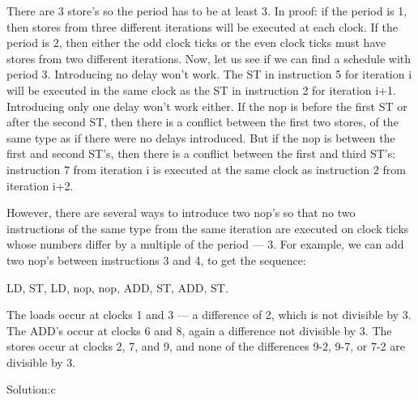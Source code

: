 \begin{problem}
{\color{red}

There are 3 store's so the period has to be at least 3. In proof: if the period is 1, then stores from three different iterations will be executed at each clock. If the period is 2, then either the odd clock ticks or the even clock ticks must have stores from two different iterations.
Now, let us see if we can find a schedule with period 3. Introducing no delay won't work. The ST in instruction 5 for iteration i will be executed in the same clock as the ST in instruction 2 for iteration i+1. Introducing only one delay won't work either. If the nop is before the first ST or after the second ST, then there is a conflict between the first two stores, of the same type as if there were no delays introduced. But if the nop is between the first and second ST's, then there is a conflict between the first and third ST's: instruction 7 from iteration i is executed at the same clock as instruction 2 from iteration i+2.

However, there are several ways to introduce two nop's so that no two instructions of the same type from the same iteration are executed on clock ticks whose numbers differ by a multiple of the period --- 3. For example, we can add two nop's between instructions 3 and 4, to get the sequence:

LD, ST, LD, nop, nop, ADD, ST, ADD, ST.

The loads occur at clocks 1 and 3 --- a difference of 2, which is not divisible by 3. The ADD's occur at clocks 6 and 8, again a difference not divisible by 3. The stores occur at clocks 2, 7, and 9, and none of the differences 9-2, 9-7, or 7-2 are divisible by 3.

Solution:c
}
\end{problem}


